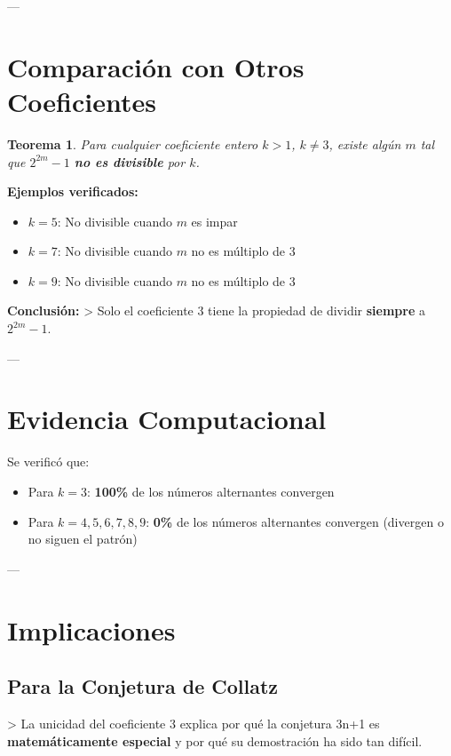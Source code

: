 \documentclass[11pt,a4paper]{article}
\newtheorem{theorem}{Teorema}[section]
\begin{document}
---

\section{Comparación con Otros Coeficientes}

\begin{theorem}
Para cualquier coeficiente entero \( k > 1 \), \( k \neq 3 \), existe algún \( m \) tal que \( 2^{2m} - 1 \) \textbf{no es divisible} por \( k \).
\end{theorem}

\textbf{Ejemplos verificados:}
\begin{itemize}
    \item \( k = 5 \): No divisible cuando \( m \) es impar
    \item \( k = 7 \): No divisible cuando \( m \) no es múltiplo de 3
    \item \( k = 9 \): No divisible cuando \( m \) no es múltiplo de 3
\end{itemize}

\textbf{Conclusión:}
> Solo el coeficiente 3 tiene la propiedad de dividir \textbf{siempre} a \( 2^{2m} - 1 \).

---

\section{Evidencia Computacional}

Se verificó que:
\begin{itemize}
    \item Para \( k = 3 \): \textbf{100\%} de los números alternantes convergen
    \item Para \( k = 4, 5, 6, 7, 8, 9 \): \textbf{0\%} de los números alternantes convergen (divergen o no siguen el patrón)
\end{itemize}

---

\section{Implicaciones}

\subsection{Para la Conjetura de Collatz}
> La unicidad del coeficiente 3 explica por qué la conjetura 3n+1 es \textbf{matemáticamente especial} y por qué su demostración ha sido tan difícil.
\end{document}
